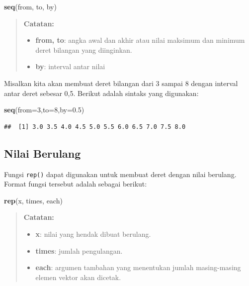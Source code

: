\documentclass[]{book}
\newenvironment{Shaded}{\begin{snugshade}}{\end{snugshade}}
\newcommand{\DataTypeTok}[1]{\textcolor[rgb]{0.13,0.29,0.53}{#1}}
\newcommand{\DecValTok}[1]{\textcolor[rgb]{0.00,0.00,0.81}{#1}}
\newcommand{\FloatTok}[1]{\textcolor[rgb]{0.00,0.00,0.81}{#1}}
\newcommand{\KeywordTok}[1]{\textcolor[rgb]{0.13,0.29,0.53}{\textbf{#1}}}
\newcommand{\NormalTok}[1]{#1}
\providecommand{\tightlist}{%
  \setlength{\itemsep}{0pt}\setlength{\parskip}{0pt}}
\theoremstyle{definition}
\theoremstyle{definition}
\theoremstyle{definition}
\theoremstyle{remark}
\begin{document}
\begin{Shaded}
\begin{Highlighting}[]
\KeywordTok{seq}\NormalTok{(from, to, by)}
\end{Highlighting}
\end{Shaded}

\begin{quote}
\textbf{Catatan:}

\begin{itemize}
\tightlist
\item
  \textbf{from, to}: angka awal dan akhir atau nilai maksimum dan minimum deret bilangan yang diinginkan.
\item
  \textbf{by}: interval antar nilai
\end{itemize}
\end{quote}

Misalkan kita akan membuat deret bilangan dari 3 sampai 8 dengan interval antar deret sebesar 0,5. Berikut adalah sintaks yang digunakan:

\begin{Shaded}
\begin{Highlighting}[]
\KeywordTok{seq}\NormalTok{(}\DataTypeTok{from=}\DecValTok{3}\NormalTok{,}\DataTypeTok{to=}\DecValTok{8}\NormalTok{,}\DataTypeTok{by=}\FloatTok{0.5}\NormalTok{)}
\end{Highlighting}
\end{Shaded}

\begin{verbatim}
##  [1] 3.0 3.5 4.0 4.5 5.0 5.5 6.0 6.5 7.0 7.5 8.0
\end{verbatim}

\hypertarget{repseq}{%
\subsection{Nilai Berulang}\label{repseq}}

Fungsi \texttt{rep()} dapat digunakan untuk membuat deret dengan nilai berulang. Format fungsi tersebut adalah sebagai berikut:

\begin{Shaded}
\begin{Highlighting}[]
\KeywordTok{rep}\NormalTok{(x, times, each)}
\end{Highlighting}
\end{Shaded}

\begin{quote}
\textbf{Catatan:}

\begin{itemize}
\tightlist
\item
  \textbf{x}: nilai yang hendak dibuat berulang.
\item
  \textbf{times}: jumlah pengulangan.
\item
  \textbf{each}: argumen tambahan yang menentukan jumlah masing-masing elemen vektor akan dicetak.
\end{itemize}
\end{quote}
\end{document}
